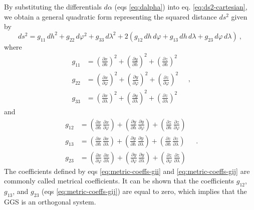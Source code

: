 \documentclass[mreferee]{gji}
\begin{document}
By substituting the differentials $d\alpha$ (eqs \ref{eq:dalpha}) into
eq. \ref{eq:ds2-cartesian}, we obtain a general quadratic form
representing the squared distance $ds^{2}$ given by
\begin{equation} \label{eq:ds2}
ds^{2} = g_{11} \, dh^{2} + g_{22} \, d\varphi^{2} + g_{33} \, d\lambda^{2} + 
2 \left( g_{12} \, dh \, d\varphi + g_{13} \, dh \, d\lambda +
g_{23} \, d\varphi \, d\lambda \right) \: ,
\end{equation}
where
\begin{equation} \label{eq:metric-coeffs-gii}
\begin{split}
g_{11} &= \left( \frac{\partial x}{\partial h} \right)^{2}
+ \left( \frac{\partial y}{\partial h} \right)^{2} +
\left( \frac{\partial z}{\partial h} \right)^{2} \\
g_{22} &= \left( \frac{\partial x}{\partial \varphi} \right)^{2}
+ \left( \frac{\partial y}{\partial \varphi} \right)^{2} +
\left( \frac{\partial z}{\partial \varphi} \right)^{2} \\
g_{33} &= \left( \frac{\partial x}{\partial \lambda} \right)^{2}
+ \left( \frac{\partial y}{\partial \lambda} \right)^{2} +
\left( \frac{\partial z}{\partial \lambda} \right)^{2}
\end{split} \quad ,
\end{equation}
and
\begin{equation} \label{eq:metric-coeffs-gij}
\begin{split}
g_{12} &=
\left( \frac{\partial x}{\partial h} \, \frac{\partial x}{\partial \varphi} \right) +
\left( \frac{\partial y}{\partial h} \, \frac{\partial y}{\partial \varphi} \right) +
\left( \frac{\partial z}{\partial h} \, \frac{\partial z}{\partial \varphi} \right) \\
g_{13} &=
\left( \frac{\partial x}{\partial h} \, \frac{\partial x}{\partial \lambda} \right) +
\left( \frac{\partial y}{\partial h} \, \frac{\partial y}{\partial \lambda} \right) +
\left( \frac{\partial z}{\partial h} \, \frac{\partial z}{\partial \lambda} \right) \\
g_{23} &=
\left( \frac{\partial x}{\partial \varphi} \, \frac{\partial x}{\partial \lambda} \right) +
\left( \frac{\partial y}{\partial \varphi} \, \frac{\partial y}{\partial \lambda} \right) +
\left( \frac{\partial z}{\partial \varphi} \, \frac{\partial z}{\partial \lambda} \right)
\end{split} \quad .
\end{equation}
The coefficients defined by eqs \ref{eq:metric-coeffs-gii} and
\ref{eq:metric-coeffs-gij} are commonly called metrical coefficients.
It can be shown that the coefficients $g_{12}$, $g_{13}$, and $g_{23}$
(eqs \ref{eq:metric-coeffs-gij}) are equal to zero, which implies that
the GGS is an orthogonal system.
\end{document}
